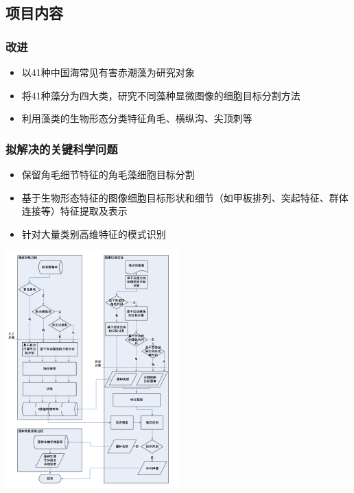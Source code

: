 \documentclass[notheorems,mathserif,table,compress]{beamer}  %
\begin{document}
\subsection{项目内容}

\begin{frame}
  \frametitle{改进}
  \begin{itemize}
  \item 以41种中国海常见有害赤潮藻为研究对象
  \item 将41种藻分为四大类，研究不同藻种显微图像的细胞目标分割方法
  \item 利用藻类的生物形态分类特征角毛、横纵沟、尖顶刺等
  \end{itemize}
\end{frame}


\begin{frame}
  \frametitle{拟解决的关键科学问题}
  \begin{itemize}
  \item 保留角毛细节特征的角毛藻细胞目标分割
  \item 基于生物形态特征的图像细胞目标形状和细节（如甲板排列、突起特征、群体连接等）特征提取及表示
  \item 针对大量类别高维特征的模式识别
  \end{itemize}
\end{frame}


\begin{frame}
\centering\includegraphics[width=0.5\textwidth]{流程图.png}
\end{frame}

\end{document}
